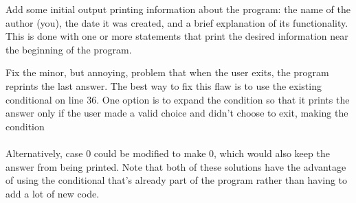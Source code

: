 
Add some initial output printing information about the program: the name of the author (you), the date it was created, and a brief explanation of its functionality.  This is done with one or more  statements that print the desired information near the beginning of the program.  

Fix the minor, but annoying, problem that when the user exits, the program reprints the last answer.  
The best way to fix this flaw is to use the existing conditional on line 36.  One option is to expand the condition so that it prints the answer only if the user made a valid choice and didn't choose to exit, making the condition\\
\\
Alternatively, case 0 could be modified to make  0, which would also keep the answer from being printed.  Note that both of these solutions have the advantage of using the conditional that's already part of the program rather than having to add a lot of new code.

